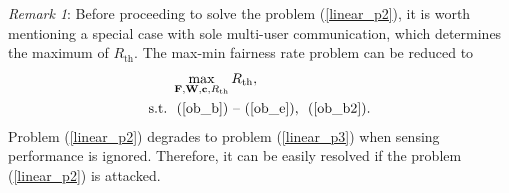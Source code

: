 \documentclass[10pt,journal,twocolumn]{IEEEtran}
\begin{document}
\emph{Remark 1}: Before proceeding to solve the problem (\ref{linear_p2}), it is worth mentioning a special case with sole multi-user communication, which determines the maximum of $R_{\text{th}}$. The max-min fairness rate problem can be reduced to
\begin{subequations}\label{linear_p3}
	\begin{align}
&\max_{\mathbf{F},\mathbf{W},\mathbf{c},R_{\text{th}} } R_{\text{th}},\label{ob_a2}\\
	\text{s.t.}~
	 &\mbox{ (\ref{ob_b}) -- (\ref{ob_e}),~ (\ref{ob_b2})}.\label{ob_b3} 
	\end{align}
\end{subequations}
Problem (\ref{linear_p2}) degrades to problem (\ref{linear_p3}) when sensing performance is ignored. Therefore, it can be easily resolved if the problem (\ref{linear_p2}) is attacked.
\end{document}
